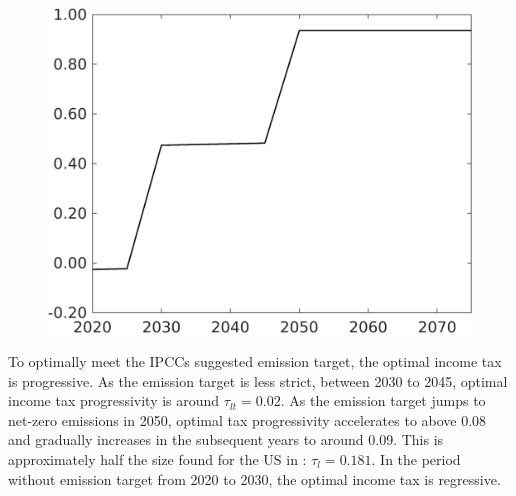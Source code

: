 \begin{figure}[h!!]
\begin{minipage}[]{0.4\textwidth}
		\includegraphics[width=1\textwidth]{../../codding_model/own_basedOnFried/optimalPol_elastS_DisuSci/figures/all_1705/Single_OPT_T_NoTaus_tauf_spillover0_sep1_BN0_ineq0_etaa0.79.png}
	\end{minipage}
\end{figure} 
To optimally meet the IPCCs suggested emission target, the optimal income tax is progressive. As the emission target is less strict, between 2030 to 2045, optimal income tax progressivity is around $\tau_{lt}=0.02$. As the emission target jumps to net-zero emissions in 2050, optimal tax progressivity accelerates to above 0.08 and gradually increases in the subsequent years to around 0.09. This is approximately half the size found for the US in \cite{Heathcote2017OptimalFramework}: $\tau_{l}=0.181$. 
In the period without emission target from 2020 to 2030, the optimal income tax is regressive.

